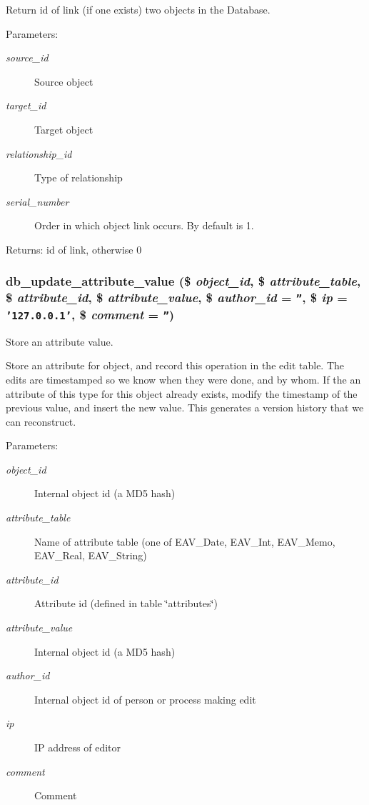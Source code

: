 Return id of link (if one exists) two objects in the Database. 

\begin{Desc}
\item[Parameters:]
\begin{description}
\item[{\em source\_\-id}]Source object \item[{\em target\_\-id}]Target object \item[{\em relationship\_\-id}]Type of relationship \item[{\em serial\_\-number}]Order in which object link occurs. By default is 1.\end{description}
\end{Desc}
\begin{Desc}
\item[Returns:]id of link, otherwise 0 \end{Desc}
\hypertarget{eav_8php_ff4248e5adeb0c01d74689bb6f709691}{
\subsubsection{\setlength{\rightskip}{0pt plus 5cm}db\_\-update\_\-attribute\_\-value (\$ {\em object\_\-id}, \/  \$ {\em attribute\_\-table}, \/  \$ {\em attribute\_\-id}, \/  \$ {\em attribute\_\-value}, \/  \$ {\em author\_\-id} = {\tt ''}, \/  \$ {\em ip} = {\tt '127.0.0.1'}, \/  \$ {\em comment} = {\tt ''})}}
\label{eav_8php_ff4248e5adeb0c01d74689bb6f709691}


Store an attribute value. 

Store an attribute for object, and record this operation in the edit table. The edits are timestamped so we know when they were done, and by whom. If the an attribute of this type for this object already exists, modify the timestamp of the previous value, and insert the new value. This generates a version history that we can reconstruct.

\begin{Desc}
\item[Parameters:]
\begin{description}
\item[{\em object\_\-id}]Internal object id (a MD5 hash) \item[{\em attribute\_\-table}]Name of attribute table (one of EAV\_\-Date, EAV\_\-Int, EAV\_\-Memo, EAV\_\-Real, EAV\_\-String) \item[{\em attribute\_\-id}]Attribute id (defined in table \char`\"{}attributes\char`\"{}) \item[{\em attribute\_\-value}]Internal object id (a MD5 hash) \item[{\em author\_\-id}]Internal object id of person or process making edit \item[{\em ip}]IP address of editor \item[{\em comment}]Comment \end{description}
\end{Desc}
